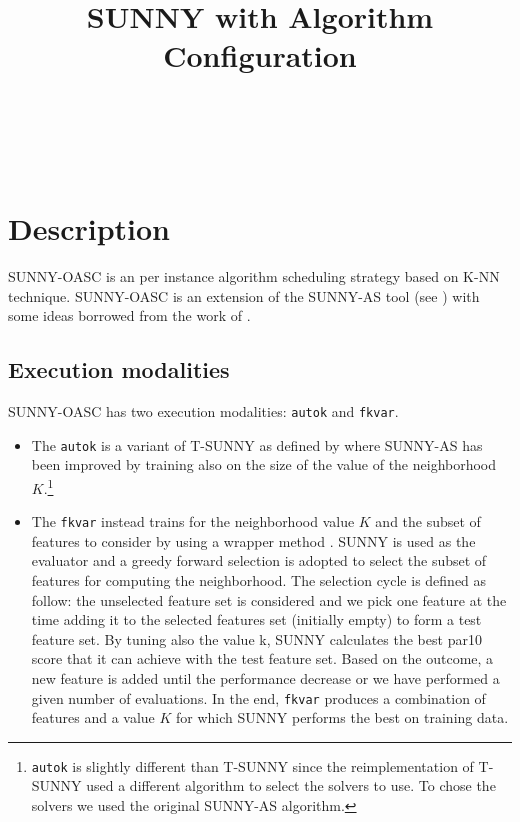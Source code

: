 \documentclass[tablecaption=bottom,wcp]{jmlr} %
\title[SUNNY-OASC]{SUNNY with Algorithm Configuration}
\author{\Name{Tong Liu} \Email{t.liu@unibo.it}\\
   \Name{Roberto Amadini} \Email{roberto.amadini@unimelb.edu.au}\\
   \Name{Jacopo Mauro} \Email{mauro.jacopo@gmail.com}\\
    }
\begin{document}
\maketitle



\section{Description}

SUNNY-OASC is an per instance algorithm scheduling strategy based on K-NN 
technique.
SUNNY-OASC is an extension of 
the SUNNY-AS tool (see \cite{ictai_paper,sunnyas}) with some 
ideas borrowed from the work of  
\cite{DBLP:conf/lion/LindauerBH16}. 


\subsection{Execution modalities}

SUNNY-OASC has two execution modalities: \texttt{autok} and 
\texttt{fkvar}. 

\begin{itemize}
  \item The \texttt{autok} is a variant of T-SUNNY as defined by 
\cite{DBLP:conf/lion/LindauerBH16} where SUNNY-AS has been improved by training 
also on the size of the value of the neighborhood 
$K$.\footnote{\texttt{autok} is slightly different than T-SUNNY since the 
reimplementation of T-SUNNY used a different algorithm to select the 
solvers to use. To chose the solvers we used the original SUNNY-AS 
algorithm.}
  \item The \texttt{fkvar} instead trains for the neighborhood value $K$ and 
the subset of features to consider by using a wrapper method 
\cite{Kohavi97wrappersfor}. SUNNY is used as the evaluator and a 
greedy forward selection is adopted to select the subset of features for 
computing the neighborhood.
% 
The selection cycle is defined as follow: 
the unselected feature set is considered and we pick one feature at the time 
adding it to the selected features set (initially empty) to form a test 
feature set. By tuning also the value k, SUNNY calculates the best par10 score 
that it can achieve with the test feature set. Based on the outcome, a new 
feature is added until the performance decrease or we have performed a given 
number of evaluations. In the end, \texttt{fkvar} 
produces a combination of features and a value $K$ for which SUNNY performs the 
best on training data.
\end{itemize}
 
\end{document}
